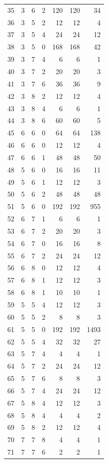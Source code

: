 \documentclass[11pt,a4paper]{article}
\begin{document}
\begin{longtable}{r|rrrr|rr}
35 & 3 & 6 & 2 & 120 & 120 & 34\\
36 & 3 & 5 & 2 & 12 & 12 & 4\\
37 & 3 & 5 & 4 & 24 & 24 & 12\\
38 & 3 & 5 & 0 & 168 & 168 & 42\\
39 & 3 & 7 & 4 & 6 & 6 & 1\\
40 & 3 & 7 & 2 & 20 & 20 & 3\\
41 & 3 & 7 & 6 & 36 & 36 & 9\\
42 & 3 & 8 & 2 & 12 & 12 & 4\\
43 & 3 & 8 & 4 & 6 & 6 & 1\\
44 & 3 & 8 & 6 & 60 & 60 & 5\\
45 & 6 & 6 & 0 & 64 & 64 & 138\\
46 & 6 & 6 & 0 & 12 & 12 & 4\\
47 & 6 & 6 & 1 & 48 & 48 & 50\\
48 & 5 & 6 & 0 & 16 & 16 & 11\\
49 & 5 & 6 & 1 & 12 & 12 & 3\\
50 & 5 & 6 & 2 & 48 & 48 & 48\\
51 & 5 & 6 & 0 & 192 & 192 & 955\\
52 & 6 & 7 & 1 & 6 & 6 & 1\\
53 & 6 & 7 & 2 & 20 & 20 & 3\\
54 & 6 & 7 & 0 & 16 & 16 & 8\\
55 & 6 & 7 & 2 & 24 & 24 & 12\\
56 & 6 & 8 & 0 & 12 & 12 & 4\\
57 & 6 & 8 & 1 & 12 & 12 & 3\\
58 & 6 & 8 & 1 & 10 & 10 & 1\\
59 & 5 & 5 & 4 & 12 & 12 & 3\\
60 & 5 & 5 & 2 & 8 & 8 & 3\\
61 & 5 & 5 & 0 & 192 & 192 & 1493\\
62 & 5 & 5 & 4 & 32 & 32 & 27\\
63 & 5 & 7 & 4 & 4 & 4 & 1\\
64 & 5 & 7 & 2 & 24 & 24 & 12\\
65 & 5 & 7 & 6 & 8 & 8 & 3\\
66 & 5 & 7 & 4 & 24 & 24 & 12\\
67 & 5 & 8 & 4 & 12 & 12 & 3\\
68 & 5 & 8 & 4 & 4 & 4 & 2\\
69 & 5 & 8 & 2 & 12 & 12 & 4\\
70 & 7 & 7 & 8 & 4 & 4 & 1\\
71 & 7 & 7 & 6 & 2 & 2 & 1\\

\end{longtable}
\end{document}
